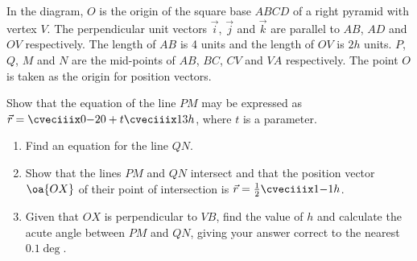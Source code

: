 \begin{problem}
    \begin{center}
    \end{center}
    In the diagram, $O$ is the origin of the square base $ABCD$ of a right pyramid with vertex $V$. The perpendicular unit vectors $\vec i$, $\vec j$ and $\vec k$ are parallel to $AB$, $AD$ and $OV$ respectively. The length of $AB$ is 4 units and the length of $OV$ is $2h$ units. $P$, $Q$, $M$ and $N$ are the mid-points of $AB$, $BC$, $CV$ and $VA$ respectively. The point $O$ is taken as the origin for position vectors.

    Show that the equation of the line $PM$ may be expressed as $\vec r = \cveciiix0{-2}0 + t\cveciiix13h$, where $t$ is a parameter.

    \begin{enumerate}
        \item Find an equation for the line $QN$.
        \item Show that the lines $PM$ and $QN$ intersect and that the position vector $\oa{OX}$ of their point of intersection is $\vec r = \frac12 \cveciiix1{-1}h$.
        \item Given that $OX$ is perpendicular to $VB$, find the value of $h$ and calculate the acute angle between $PM$ and $QN$, giving your answer correct to the nearest $0.1\deg$.
    \end{enumerate}
\end{problem}
